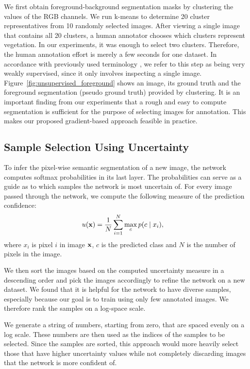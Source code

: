 \documentclass[letterpaper, 10 pt, conference]{ieeeconf}  %
\begin{document}
We first obtain foreground-background segmentation masks by clustering the values of the RGB channels. We run k-means to determine 20 cluster representatives from 10 randomly selected images. After viewing a single image that contains all 20 clusters, a human annotator chooses which clusters represent vegetation. In our experiments, it was enough to select two clusters. Therefore, the human annotation effort is merely a few seconds for one dataset. In accordance with previously used terminology \cite{zhang2018self}, we refer to this step as being very weakly supervised, since it only involves inspecting a single image. Figure~\ref{fig:unsupervised_foreground} shows an image, its ground truth and the foreground segmentation (pseudo ground truth) provided by clustering. It is an important finding from our experiments that a rough and easy to compute segmentation is sufficient for the purpose of selecting images for annotation. This makes our proposed gradient-based approach feasible in practice.



\subsection{Sample Selection Using Uncertainty}
\label{ssec:unc}
To infer the pixel-wise semantic segmentation of a new image, the network computes softmax probabilities in its last layer. The probabilities can serve as a guide as to which samples the network is most uncertain of. For every image passed through the network, we compute the following measure of the prediction confidence:
\begin{align}
u(\bold{x}) &= \frac{1}{N} \sum_{i=1}^N \max_c p(c  \mid  x_i),
\end{align}  
\noindent
where $x_i$ is pixel $i$ in image $\bold{x}$, $c$ is the predicted class and $N$ is the number of pixels in the image.

We then sort the images based on the computed uncertainty measure in a descending order and pick the images accordingly to refine the network on a new dataset. We found that it is helpful for the network to have diverse samples, especially because our goal is to train using only few annotated images. We therefore rank the samples on a log-space scale.

We generate a string of numbers, starting from zero, that are spaced evenly on a log scale. These numbers are then used as the indices of the samples to be selected. Since the samples are sorted, this approach would more heavily select those that have higher uncertainty values while not completely discarding images that the network is more confident of.
\end{document}
